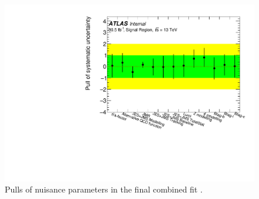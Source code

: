 \begin{figure}
\centering
\includegraphics[width=0.7\linewidth]{figures/results/nuisance_parameters}
\caption{ 
Pulls of nuisance parameters in the final combined fit \cite{Krizka:2310645}.
}
\label{sec:results:nuisance_parameters}
\end{figure}

